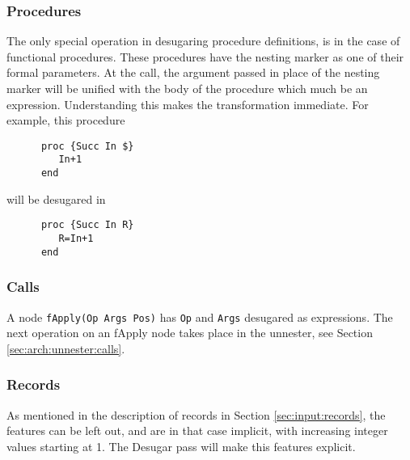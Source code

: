 \documentclass[a4paper]{memoir}
\begin{document}
\subsubsection{Procedures}\label{sec:arch:desugar:procedures}
The only special operation in desugaring procedure definitions, is in the case
of functional procedures. These procedures have the nesting marker as one of
their formal parameters. At the call, the argument passed in place of the
nesting marker will be unified with the body of the procedure which much be an
expression. 
Understanding this makes the transformation immediate. For example, this procedure
\begin{lstlisting}
      proc {Succ In $}
         In+1
      end
\end{lstlisting}

will be desugared in

\begin{lstlisting}
      proc {Succ In R}
         R=In+1
      end
\end{lstlisting}
\subsubsection{Calls}\label{sec:arch:desugar:calls}
A node \lstinline!fApply(Op Args Pos)! has \lstinline!Op! and \lstinline!Args!
desugared as expressions.
The next operation on an fApply node takes place in the unnester, see Section
\ref{sec:arch:unnester:calls}. 
\subsubsection{Records}\label{sec:arch:desugar:records}
As mentioned in the description of records in Section \ref{sec:input:records}, the features can be left out, and are in that case implicit, with increasing integer values starting at 1. The Desugar pass will make this features explicit.
\end{document}
